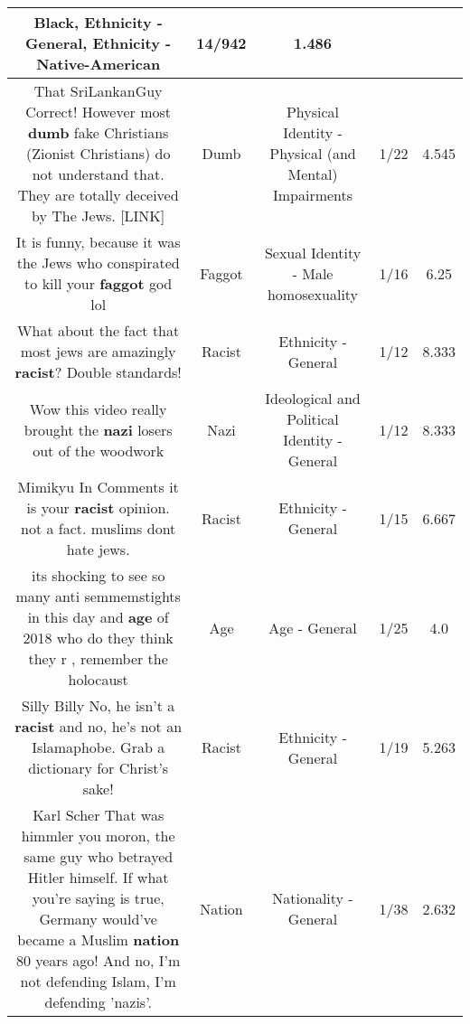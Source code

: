 \documentclass[11pt]{article}
\newlength\mylength
\begin{document}
\begin{center}
\begin{longtable}{|C{.65\mylength}|C{.30\mylength}|C{.12\mylength}|C{.12\mylength}|C{.12\mylength}|}
Black, Ethnicity - General, Ethnicity - Native-American & 14/942 & 1.486 \\  \hline
  \small That SriLankanGuy Correct! However most \textbf{dumb} fake Christians (Zionist Christians) do not understand that. They are totally deceived by The Jews.  [LINK] \normalsize   & Dumb & Physical Identity - Physical (and Mental) Impairments & 1/22 & 4.545 \\  \hline
  \small It is funny, because it was the Jews who conspirated to kill your \textbf{faggot} god lol\normalsize   & Faggot & Sexual Identity - Male homosexuality & 1/16 & 6.25 \\  \hline
  \small What about the fact that most jews are amazingly \textbf{racist}?  Double standards!\normalsize   & Racist & Ethnicity - General & 1/12 & 8.333 \\  \hline
  \small Wow this video really brought the \textbf{nazi} losers out of the woodwork\normalsize   & Nazi &  Ideological and Political Identity - General & 1/12 & 8.333 \\  \hline
  \small Mimikyu In Comments it is your \textbf{racist} opinion. not a fact. muslims dont hate jews.\normalsize   & Racist & Ethnicity - General & 1/15 & 6.667 \\  \hline
  \small its shocking to see so many anti semmemstights in this day and \textbf{age} of 2018 who do they think they r , remember the holocaust\normalsize   & Age & Age - General & 1/25 & 4.0 \\  \hline
  \small Silly Billy No, he isn't a \textbf{racist} and no, he's not an Islamaphobe. Grab a dictionary for Christ's sake!\normalsize   & Racist & Ethnicity - General & 1/19 & 5.263 \\  \hline
  \small Karl Scher That was himmler you moron, the same guy who betrayed Hitler himself. If what you're saying is true, Germany would've became a Muslim \textbf{nation} 80 years ago! And no, I'm not defending Islam, I'm defending 'nazis'.\normalsize   & Nation & Nationality - General & 1/38 & 2.632 \\  \hline

\end{longtable}
\end{center}
\end{document}
